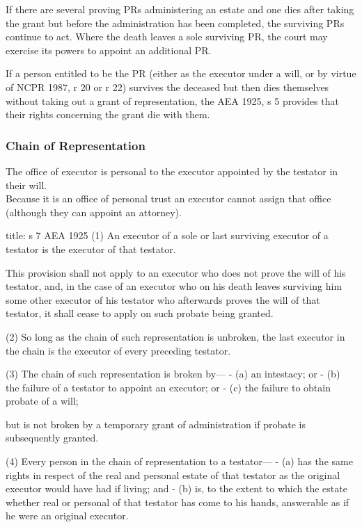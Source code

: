 \documentclass[
]{article}
\newenvironment{Shaded}{}{}
\newcommand{\NormalTok}[1]{#1}
\begin{document}
If there are several proving PRs administering an estate and one dies
after taking the grant but before the administration has been completed,
the surviving PRs continue to act. Where the death leaves a sole
surviving PR, the court may exercise its powers to appoint an additional
PR.

If a person entitled to be the PR (either as the executor under a will,
or by virtue of NCPR 1987, r 20 or r 22) survives the deceased but then
dies themselves without taking out a grant of representation, the AEA
1925, s 5 provides that their rights concerning the grant die with them.

\hypertarget{chain-of-representation}{%
\subsubsection{Chain of Representation}\label{chain-of-representation}}

The office of executor is personal to the executor appointed by the
testator in their will.\\
Because it is an office of personal trust an executor cannot assign that
office (although they can appoint an attorney).

\begin{Shaded}
\begin{Highlighting}[]
\NormalTok{title: s 7 AEA 1925}
\NormalTok{(1) An executor of a sole or last surviving executor of a testator is the executor of that testator.}

\NormalTok{This provision shall not apply to an executor who does not prove the will of his testator, and, in the case of an executor who on his death leaves surviving him some other executor of his testator who afterwards proves the will of that testator, it shall cease to apply on such probate being granted.}

\NormalTok{(2) So long as the chain of such representation is unbroken, the last executor in the chain is the executor of every preceding testator.}

\NormalTok{(3) The chain of such representation is broken by—}
\NormalTok{{-} (a) an intestacy; or}
\NormalTok{{-} (b) the failure of a testator to appoint an executor; or}
\NormalTok{{-} (c) the failure to obtain probate of a will;}

\NormalTok{but is not broken by a temporary grant of administration if probate is subsequently granted.}

\NormalTok{(4) Every person in the chain of representation to a testator—}
\NormalTok{{-} (a) has the same rights in respect of the real and personal estate of that testator as the original executor would have had if living; and}
\NormalTok{{-} (b) is, to the extent to which the estate whether real or personal of that testator has come to his hands, answerable as if he were an original executor.}
\end{Highlighting}
\end{Shaded}
\end{document}
